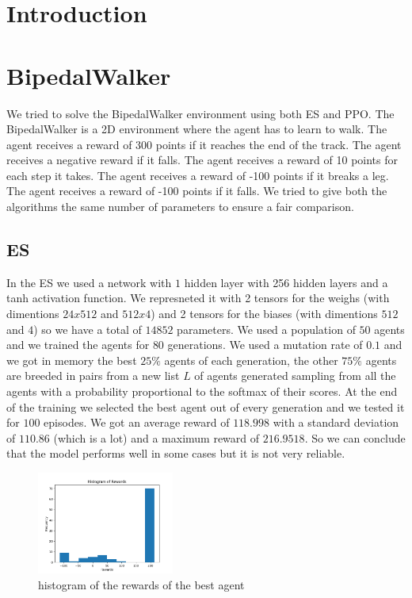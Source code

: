 \documentclass[10pt,a4paper]{article}
\begin{document}
	\begin{multicols}{2}
		\section{Introduction}

		\section{BipedalWalker}
		We tried to solve the BipedalWalker environment using both ES and PPO. The BipedalWalker is a 2D environment where the agent has to learn to walk. The agent receives a reward of 300 points if it reaches the end of the track. The agent receives a negative reward if it falls. The agent receives a reward of 10 points for each step it takes. The agent receives a reward of -100 points if it breaks a leg. The agent receives a reward of -100 points if it falls. 
		We tried to give both the algorithms the same number of parameters to ensure a fair comparison. 
		\subsection{ES}
		In the ES we used a network with $1$ hidden layer with 256 hidden layers and a tanh activation function. We represneted it with 2 tensors for the weighs (with dimentions $24x512$ and $512x4$) and 2 tensors for the biases (with dimentions $512$ and $4$) so we have a total of $14852$ parameters.
		We used a population of $50$ agents and we trained the agents for $80$ generations. We used a mutation rate of $0.1$ and we got in memory the best $25\%$ agents of each generation, the other $75\%$ agents are breeded in pairs from a new list $L$ of agents generated sampling from all the agents with a probability proportional to the softmax of their scores. 
		At the end of the training we selected the best agent out of every generation and we tested it for $100$ episodes. We got an average reward of $118.998$ with a standard deviation of $110.86$ (which is a lot) and a maximum reward of $216.9518$. So we can conclude that the model performs well in some cases but it is not very reliable.
		\begin{figure}[H]
			\centering
			\includegraphics[width=0.4\textwidth]{histogramES.png}
			\caption{histogram of the rewards of the best agent}
			\label{fig:es_bipedalwalker}
		\end{figure}
		

\end{multicols}
\end{document}

